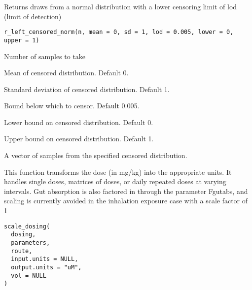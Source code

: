 \documentclass[a4paper]{book}
\begin{document}
%
\begin{Description}\relax
Returns draws from a normal distribution with a lower censoring limit of lod
(limit of detection)
\end{Description}
%
\begin{Usage}
\begin{verbatim}
r_left_censored_norm(n, mean = 0, sd = 1, lod = 0.005, lower = 0, upper = 1)
\end{verbatim}
\end{Usage}
%
\begin{Arguments}
\begin{ldescription}
\item[\code{n}] Number of samples to take

\item[\code{mean}] Mean of censored distribution. Default 0.

\item[\code{sd}] Standard deviation of censored distribution. Default 1.

\item[\code{lod}] Bound below which to censor. Default 0.005.

\item[\code{lower}] Lower bound on censored distribution. Default 0.

\item[\code{upper}] Upper bound on censored distribution. Default 1.
\end{ldescription}
\end{Arguments}
%
\begin{Value}
A vector of samples from the specified censored distribution.
\end{Value}
%
\begin{Description}\relax
This function transforms the dose (in mg/kg) into the appropriate units. It
handles single doses, matrices of doses, or daily repeated doses at varying
intervals. Gut absorption is also factored in through the parameter Fgutabs,
and scaling is currently avoided in the inhalation exposure case with a 
scale factor of 1
\end{Description}
%
\begin{Usage}
\begin{verbatim}
scale_dosing(
  dosing,
  parameters,
  route,
  input.units = NULL,
  output.units = "uM",
  vol = NULL
)
\end{verbatim}
\end{Usage}
\end{document}
